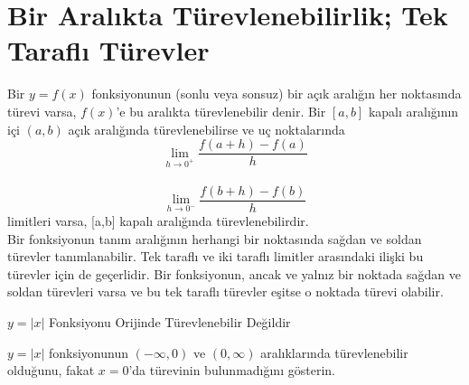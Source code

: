 \section{\protect Bir Aralıkta Türevlenebilirlik; Tek Taraflı Türevler}\label{bolumetiketi}
Bir $y=f(x)$ fonksiyonunun (sonlu veya sonsuz) bir açık aralığın her noktasında türevi varsa, $f(x)$'e bu aralıkta türevlenebilir denir. Bir $[a,b]$ kapalı aralığının içi $(a,b)$ açık aralığında türevlenebilirse ve uç noktalarında
\begin{equation*}
	\lim_{h \rightarrow 0^+}\frac{f(a+h)-f(a)}{h} 
\end{equation*}\\
\begin{equation*}
	\lim_{h \rightarrow 0^-}\frac{f(b+h)-f(b)}{h}
\end{equation*}
limitleri varsa, [a,b] kapalı aralığında türevlenebilirdir. \\
	Bir fonksiyonun tanım aralığının herhangi bir noktasında sağdan ve soldan türevler tanımlanabilir. Tek taraflı ve iki taraflı limitler arasındaki ilişki bu türevler için de geçerlidir. Bir fonksiyonun, ancak ve yalnız bir noktada sağdan ve soldan türevleri varsa ve bu tek taraflı türevler eşitse o noktada türevi olabilir.
\begin{ornek}
$y=|x|$ Fonksiyonu Orijinde Türevlenebilir Değildir

$y=|x|$ fonksiyonunun $(-\infty,0)$ ve $(0,\infty)$ aralıklarında türevlenebilir olduğunu, fakat $x=0$'da türevinin bulunmadığını gösterin.
\end{ornek}
